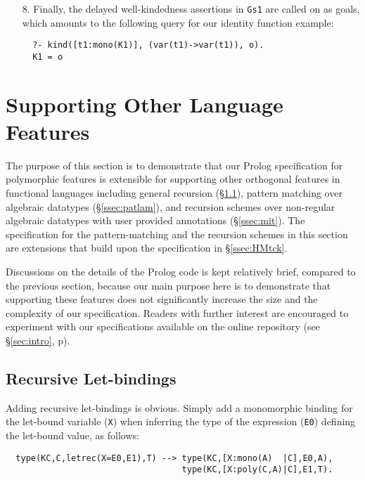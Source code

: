 \documentclass[runningheads,a4paper]{llncs}
\begin{document}
\begin{itemize}
{\small\verb|Gs1 = [kind([t1:mono(K1)], (var(t1)->var(t1)), o)]|}.
\item[8.] Finally, the delayed well-kindedness assertions in {\small\verb|Gs1|}
  are called on as goals, which amounts to the following query
  for our identity function example:{\small \vspace*{-1ex}
\begin{verbatim}
  ?- kind([t1:mono(K1)], (var(t1)->var(t1)), o).
  K1 = o
\end{verbatim} \vspace*{-.7ex} }%
\vspace*{-1.5ex}
\end{itemize}

\section{Supporting Other Language Features}\label{sec:other}
The purpose of this section is to demonstrate that our Prolog specification
for polymorphic features is extensible for supporting other orthogonal
features in functional languages including general recursion
(\S\ref{ssec:letrec}), pattern matching over algebraic datatypes
(\S\ref{ssec:patlam}), and recursion schemes over non-regular
algebraic datatypes with user provided annotations (\S\ref{ssec:mit}).
The specification for the pattern-matching and the recursion schemes
in this section are extensions that build upon the specification
in \S\ref{ssec:HMtck}.

Discussions on the details of the Prolog code is kept relatively brief,
compared to the previous section, because our main purpose here is to
demonstrate that supporting these features does not significantly increase
the size and the complexity of our specification. Readers with further
interest are encouraged to experiment with our specifications available
on the online repository (see \S\ref{sec:intro}, p\pageref{githubURL}).

\subsection{Recursive Let-bindings}\label{ssec:letrec}
Adding recursive let-bindings is obvious. Simply add
a monomorphic binding for the let-bound variable (\verb|X|)
when inferring the type of the expression (\verb|E0|) defining
the let-bound value, as follows:
{\small \vspace*{-1ex}
\begin{verbatim}
  type(KC,C,letrec(X=E0,E1),T) --> type(KC,[X:mono(A)  |C],E0,A),
                                   type(KC,[X:poly(C,A)|C],E1,T).
\end{verbatim} \vspace*{-.7ex} }
\end{document}
